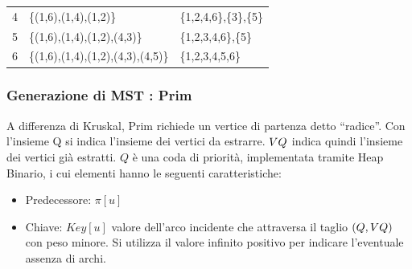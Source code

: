 \documentclass{article}
\providecommand{\tightlist}{%
  \setlength{\itemsep}{0pt}\setlength{\parskip}{0pt}}
\begin{document}
{{{\begin{longtable}[]{@{}lll@{}}
\begin{minipage}[t]{0.30\columnwidth}
{4}\strut
\end{minipage} & \begin{minipage}[t]{0.30\columnwidth}\raggedright\strut
{\{(1,6),(1,4),(1,2)\}}\strut
\end{minipage} & \begin{minipage}[t]{0.30\columnwidth}\raggedright\strut
{\{1,2,4,6\},\{3\},\{5\}}\strut
\end{minipage}\tabularnewline
\begin{minipage}[t]{0.30\columnwidth}\raggedright\strut
{5}\strut
\end{minipage} & \begin{minipage}[t]{0.30\columnwidth}\raggedright\strut
{\{(1,6),(1,4),(1,2),(4,3)\}}\strut
\end{minipage} & \begin{minipage}[t]{0.30\columnwidth}\raggedright\strut
{\{1,2,3,4,6\},\{5\}}\strut
\end{minipage}\tabularnewline
\begin{minipage}[t]{0.30\columnwidth}\raggedright\strut
{6}\strut
\end{minipage} & \begin{minipage}[t]{0.30\columnwidth}\raggedright\strut
{\{(1,6),(1,4),(1,2),(4,3),(4,5)\}}\strut
\end{minipage} & \begin{minipage}[t]{0.30\columnwidth}\raggedright\strut
{\{1,2,3,4,5,6\}}\strut
\end{minipage}\tabularnewline
\bottomrule
\end{longtable}

\hypertarget{h.l5wypo8krmqc}{\subsubsection{\texorpdfstring{{Generazione di MST : Prim}}{Generazione di MST : Prim}}\label{h.l5wypo8krmqc}}

{A differenza di Kruskal, Prim richiede un vertice di partenza detto ``radice''. Con l'insieme Q si indica l'insieme dei vertici da estrarre.
$V\\Q$ indica quindi l'insieme dei vertici già estratti. $Q$ è una coda di priorità, implementata tramite Heap Binario, i cui elementi hanno le seguenti caratteristiche:}

\begin{itemize}
\tightlist
\item
  Predecessore: $\pi[u]$
\item
Chiave: $Key[u]$ valore dell'arco incidente che attraversa il taglio $(Q,V\\Q)$ con peso minore. Si utilizza il valore infinito positivo per indicare l'eventuale assenza di archi.
\end{itemize}

}}}
\end{document}
